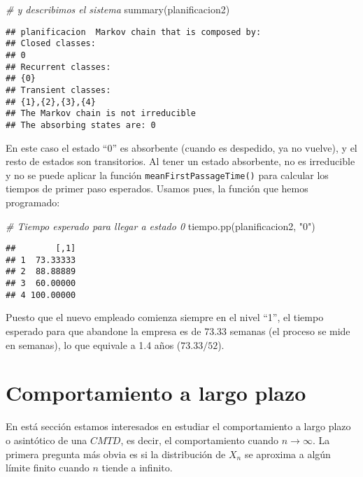 \documentclass[
]{book}
\newenvironment{Shaded}{\begin{snugshade}}{\end{snugshade}}
\newcommand{\CommentTok}[1]{\textcolor[rgb]{0.56,0.35,0.01}{\textit{#1}}}
\newcommand{\FunctionTok}[1]{\textcolor[rgb]{0.00,0.00,0.00}{#1}}
\newcommand{\NormalTok}[1]{#1}
\newcommand{\StringTok}[1]{\textcolor[rgb]{0.31,0.60,0.02}{#1}}
\theoremstyle{definition}
\theoremstyle{definition}
\theoremstyle{definition}
\theoremstyle{definition}
\theoremstyle{remark}
\begin{document}
\begin{Shaded}
\begin{Highlighting}[]
\CommentTok{\# y describimos el sistema}
\FunctionTok{summary}\NormalTok{(planificacion2)}
\end{Highlighting}
\end{Shaded}

\begin{verbatim}
## planificacion  Markov chain that is composed by: 
## Closed classes: 
## 0 
## Recurrent classes: 
## {0}
## Transient classes: 
## {1},{2},{3},{4}
## The Markov chain is not irreducible 
## The absorbing states are: 0
\end{verbatim}

En este caso el estado ``0'' es absorbente (cuando es despedido, ya no vuelve), y el resto de estados son transitorios. Al tener un estado absorbente, no es irreducible y no se puede aplicar la función \texttt{meanFirstPassageTime()} para calcular los tiempos de primer paso esperados. Usamos pues, la función que hemos programado:

\begin{Shaded}
\begin{Highlighting}[]
\CommentTok{\# Tiempo esperado para llegar a estado 0}
\FunctionTok{tiempo.pp}\NormalTok{(planificacion2, }\StringTok{"0"}\NormalTok{)}
\end{Highlighting}
\end{Shaded}

\begin{verbatim}
##        [,1]
## 1  73.33333
## 2  88.88889
## 3  60.00000
## 4 100.00000
\end{verbatim}

Puesto que el nuevo empleado comienza siempre en el nivel ``1'', el tiempo esperado para que abandone la empresa es de 73.33 semanas (el proceso se mide en semanas), lo que equivale a 1.4 años (\(73.33/52\)).

\hypertarget{AsinCMTD}{%
\section{Comportamiento a largo plazo}\label{AsinCMTD}}

En está sección estamos interesados en estudiar el comportamiento a largo plazo o asintótico de una \(CMTD\), es decir, el comportamiento cuando \(n \rightarrow \infty\). La primera pregunta más obvia es si la distribución de \(X_n\) se aproxima a algún límite finito cuando \(n\) tiende a infinito.
\end{document}
